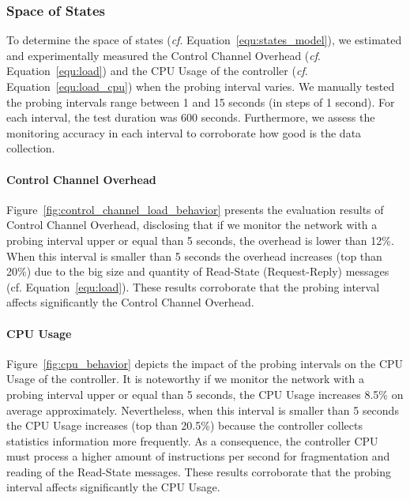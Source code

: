 \subsubsection{Space of States}
\label{subsubsec:space_states}
To determine the space of states (\textit{cf}. Equation~\ref{equ:states_model}), we estimated and experimentally measured the Control Channel Overhead (\textit{cf}. Equation~\ref{equ:load}) and the CPU Usage of the controller (\textit{cf}. Equation~\ref{equ:load_cpu}) when the probing interval varies. We manually tested the probing intervals range between 1 and 15 seconds (in steps of 1 second). For each interval, the test duration was 600 seconds. Furthermore, we assess the monitoring accuracy in each interval to corroborate how good is the data collection.

\paragraph{\textbf{Control Channel Overhead}}
Figure~\ref{fig:control_channel_load_behavior} presents the evaluation results of Control Channel Overhead, disclosing that if we monitor the network with a probing interval upper or equal than 5 seconds, the overhead is lower than 12\%. When this interval is smaller than 5 seconds the overhead increases (top than 20\%) due to the big size and quantity of Read-State (Request-Reply) messages (cf. Equation~\ref{equ:load}). These results corroborate that the probing interval affects significantly the Control Channel Overhead.

\begin{figure*}[h!]
    \centering
    
    \caption{Control Channel Overhead}
    \label{fig:control_channel_load_behavior}
\end{figure*}

\paragraph{\textbf{CPU Usage}}
Figure~\ref{fig:cpu_behavior} depicts the impact of the probing intervals on the CPU Usage of the controller. It is noteworthy if we monitor the network with a probing interval upper or equal than 5 seconds, the CPU Usage increases 8.5\% on average approximately. Nevertheless, when this interval is smaller than 5 seconds the CPU Usage increases (top than 20.5\%) because the controller collects statistics information more frequently. As a consequence, the controller CPU must process a higher amount of instructions per second for fragmentation and reading of the Read-State messages. These results corroborate that the probing interval affects significantly the CPU Usage.

